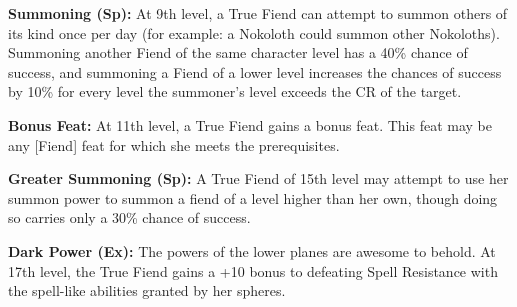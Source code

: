 \textbf{Summoning (Sp):} At 9th level, a True Fiend can attempt to summon others of its kind once per day (for example: a Nokoloth could summon other Nokoloths). Summoning another Fiend of the same character level has a 40\% chance of success, and summoning a Fiend of a lower level increases the chances of success by 10\% for every level the summoner's level exceeds the CR of the target.

\textbf{Bonus Feat:} At 11th level, a True Fiend gains a bonus feat. This feat may be any [Fiend] feat for which she meets the prerequisites.

\textbf{Greater Summoning (Sp):} A True Fiend of 15th level may attempt to use her summon power to summon a fiend of a level higher than her own, though doing so carries only a 30\% chance of success.

\textbf{Dark Power (Ex):} The powers of the lower planes are awesome to behold. At 17th level, the True Fiend gains a +10 bonus to defeating Spell Resistance with the spell-like abilities granted by her spheres.
